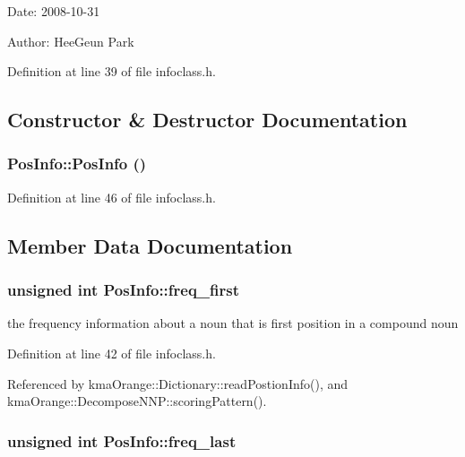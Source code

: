 \begin{Desc}
\item[Date:]2008-10-31 \end{Desc}
\begin{Desc}
\item[Author:]HeeGeun Park \end{Desc}


Definition at line 39 of file infoclass.h.

\subsection{Constructor \& Destructor Documentation}
\hypertarget{classPosInfo_828283f9428c078fa1c7df2ef3f48e2d}{
\subsubsection[{PosInfo}]{\setlength{\rightskip}{0pt plus 5cm}PosInfo::PosInfo ()}}
\label{classPosInfo_828283f9428c078fa1c7df2ef3f48e2d}




Definition at line 46 of file infoclass.h.

\subsection{Member Data Documentation}
\hypertarget{classPosInfo_dfbb5c662cb289ba7c53712757af4e7c}{
\subsubsection[{freq\_\-first}]{\setlength{\rightskip}{0pt plus 5cm}unsigned int {\bf PosInfo::freq\_\-first}}}
\label{classPosInfo_dfbb5c662cb289ba7c53712757af4e7c}


the frequency information about a noun that is first position in a compound noun 



Definition at line 42 of file infoclass.h.

Referenced by kmaOrange::Dictionary::readPostionInfo(), and kmaOrange::DecomposeNNP::scoringPattern().\hypertarget{classPosInfo_becd8d727f72e68f80df7f00f29ca37d}{
\subsubsection[{freq\_\-last}]{\setlength{\rightskip}{0pt plus 5cm}unsigned int {\bf PosInfo::freq\_\-last}}}
\label{classPosInfo_becd8d727f72e68f80df7f00f29ca37d}


